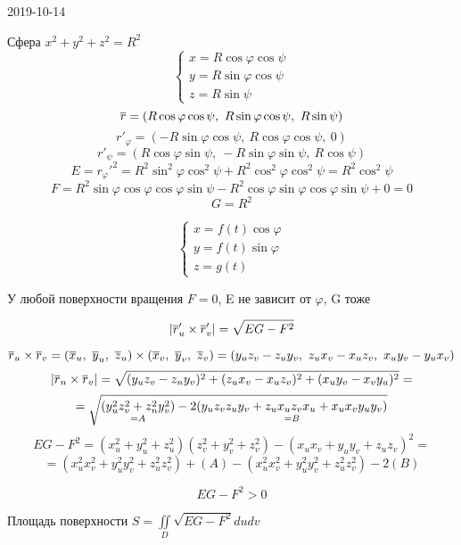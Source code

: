 \documentclass[main]{subfiles}
\begin{document}
\begin{lect} {2019-10-14}
	  \begin{example}
	    Сфера $x^2 + y^2 + z^2 = R^2$
	    \[\begin{cases}
	      x = R \cos\varphi \cos\psi\\
	      y = R \sin\varphi \cos\psi\\
	      z = R \sin\psi
	    \end{cases}\]
	    \[\overline{r} = (R \cos\varphi \cos\psi,\ R\sin\varphi \cos\psi,\ R \sin\psi)\]
	    \[r'_{\varphi} = (-R \sin\varphi \cos\psi,\ R\cos\varphi \cos\psi,\ 0)\]
	    \[r'_{\psi} = (R \cos\varphi \sin\psi,\ -R\sin\varphi \sin\psi,\ R \cos\psi)\]
	    \[E = r_{\varphi}'^2 = R^2 \sin^2 \varphi \cos^2 \psi + R^2 \cos^2 \varphi \cos^2 \psi = R^2 \cos^2 \psi\]
	    \[F = R^2 \sin\varphi \cos\varphi\cos\varphi\sin\psi - R^2 \cos\varphi \sin\varphi \cos\varphi \sin\psi + 0 = 0\]
	    \[G = R^2\]
	  \end{example}

	  \begin{example} 
	    \[\begin{cases}
	      x = f(t) \cos\varphi\\
	      y = f(t) \sin\varphi\\
	      z = g(t)
	    \end{cases}\]
	  \end{example}

	  \begin{upr}
	    У любой поверхности вращения $F=0$, E не зависит от $\varphi$, G тоже
	  \end{upr}

	  \begin{Theorem}
	    \[|\overline{r}'_u \times \overline{r}'_v| = \sqrt{EG-F^2}\]
	  \end{Theorem}

	  \begin{Proof}
	    \[\ol{r}_u \times \ol{r}_v = (\ol{x}_u,\ \ol{y}_u,\ \ol{z}_u) \times (\ol{x}_v,\ \ol{y}_v,\ \ol{z}_v) = (y_u z_v - z_u y_v,\ z_u x_v - x_u z_v,\ x_u y_v - y_u x_v)\]
	    \[|\overline{r}_n \times \overline{r}_v| = \sqrt{(y_u z_v - z_n y_v)^2 + (z_u x_v - x_u z_v)^2 + (x_u y_v - x_v y_u)^2} = \]
	    \[= \sqrt{\underset{=A}{(y_u^2 z_v^2 + z_n^2 y_v^2)} - 2 \underset{=B}{(y_u z_v z_u y_v + z_u x_u z_v x_u + x_u x_v y_u y_v)}}\]
	    \[EG-F^2 = (x_u^2 + y_u^2 + z_u^2)(z_v^2 + y_v^2 + z_v^2) - (x_u x_v + y_u y_v + z_u z_v)^2 =\]
	    \[= (x_u^2 x_v^2 + y_u^2 y_v^2 + z_u^2 z_v^2) + (A)-(x_u^2 x_v^2 + y_u^2 y_v^2 + z_u^2 z_v^2) - 2(B)\]
	  \end{Proof}

	  \begin{Consequence}
	    \[EG-F^2 > 0\]
	  \end{Consequence}

	  \begin{theorem}
	    Площадь поверхности $S = \iint\limits_D \sqrt{EG - F^2} du dv$
	  \end{theorem}
	\end{lect}
\end{document}
